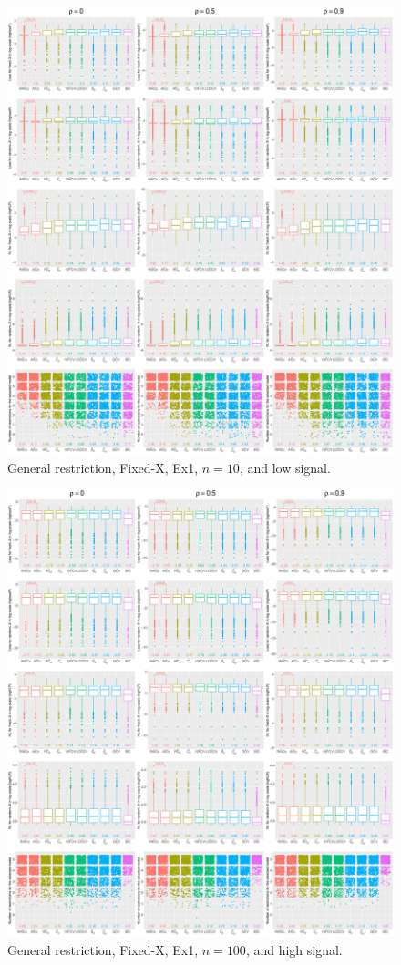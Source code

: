 \clearpage
\begin{figure}[!ht]
\centering
\includegraphics[width=\textwidth]{figures/supplement/fixedx/general_restriction/Ex1_n10_lsnr.eps}
\caption{General restriction, Fixed-X, Ex1, $n=10$, and low signal.}
\end{figure}
\clearpage
\begin{figure}[!ht]
\centering
\includegraphics[width=\textwidth]{figures/supplement/fixedx/general_restriction/Ex1_n100_hsnr.eps}
\caption{General restriction, Fixed-X, Ex1, $n=100$, and high signal.}
\end{figure}
